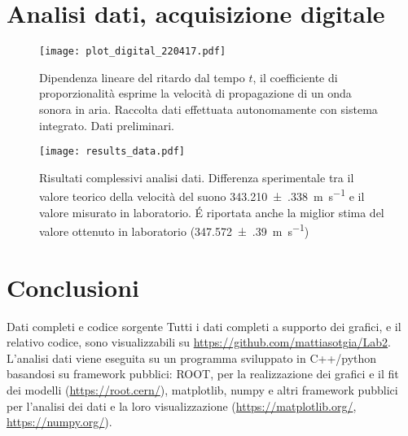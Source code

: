 \documentclass[
    rmp,
    reprint, 
    superscriptaddress, 
    altaffilletter, 
    amsmath, 
    amssymb, 
    a4paper,
    varvw]{revtex4-2}
\begin{document}
\section{Analisi dati, acquisizione digitale}




\begin{figure}[!t]
    \centering
    \texttt{[image: plot\_digital\_220417.pdf]}
    \caption{Dipendenza lineare del ritardo dal tempo $t$, il coefficiente di proporzionalità esprime la velocità di propagazione di un onda sonora in aria. Raccolta dati effettuata autonomamente con sistema integrato. Dati preliminari.}\label{fig:digital_plot_d2}
\end{figure}

\begin{figure}
    \centering
    \texttt{[image: results\_data.pdf]}
    \caption{Risultati complessivi analisi dati. Differenza sperimentale tra il valore teorico della velocità del suono \SI{343.210(338)}{\metre\per\second} e il valore misurato in laboratorio. \'E riportata anche la miglior stima del valore ottenuto in laboratorio (\SI{347.572(390)}{\metre\per\second})}\label{fig:results}
\end{figure}

\iffalse
\fi


\section{Conclusioni}


\begin{methods}{D\lowercase{ati completi e codice sorgente}}
    Tutti i dati completi a supporto dei grafici, e il relativo codice, sono visualizzabili su \url{https://github.com/mattiasotgia/Lab2}. L'analisi dati viene eseguita su un programma sviluppato in C++/python basandosi su framework pubblici: ROOT, per la realizzazione dei grafici e il fit dei modelli (\url{https://root.cern/}), matplotlib, numpy e altri framework pubblici per l'analisi dei dati e la loro visualizzazione (\url{https://matplotlib.org/}, \url{https://numpy.org/}).
\end{methods}

\appendix
\end{document}
